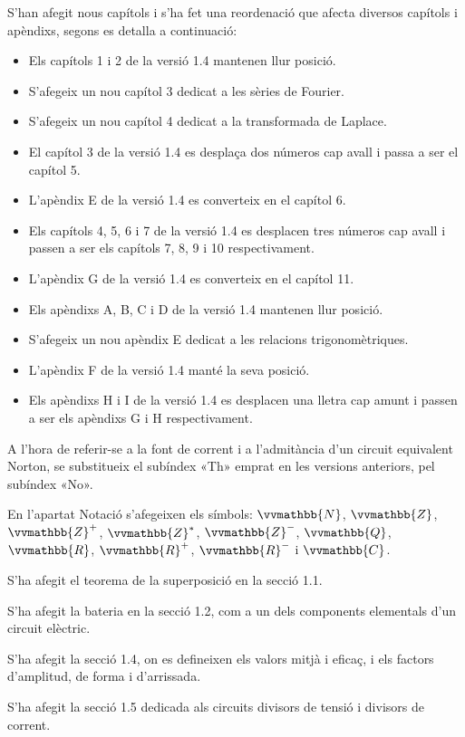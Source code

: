 S'han afegit nous capítols i s'ha fet una reordenació que afecta 
diversos capítols i apèndixs, segons es detalla a continuació:
\begin{itemize}
   \item Els capítols 1 i 2  de la versió 1.4 mantenen llur posició.
   \item S'afegeix un nou capítol 3 dedicat a les sèries de Fourier.
   \item S'afegeix un nou capítol 4 dedicat a la transformada de Laplace.
   \item El capítol 3 de la versió 1.4 es desplaça dos números cap
    avall i passa a ser el capítol 5.
   \item L'apèndix E de la versió 1.4 es converteix en el capítol 6.
   \item Els capítols 4, 5, 6 i 7  de la versió 1.4 es desplacen tres números cap
    avall i passen a ser els capítols 7, 8, 9 i 10 respectivament.
    \item L'apèndix G de la versió 1.4 es converteix en el capítol 11.
    \item Els apèndixs A, B, C i D de la versió 1.4 mantenen llur posició.
    \item S'afegeix un nou apèndix E dedicat a les relacions trigonomètriques.
    \item L'apèndix F de la versió 1.4 manté la seva posició.
    \item Els apèndixs H i I de la versió 1.4 es desplacen una lletra cap
    amunt i passen a ser els apèndixs G i H respectivament.
\end{itemize}


 A l'hora de referir-se a la font de corrent i a l'admitància d'un circuit equivalent
 Norton, se substitueix el subíndex «Th» emprat en les versions
anteriors, pel subíndex «No».

En l'apartat Notació s'afegeixen els símbols: $\vvmathbb{N}$,
$\vvmathbb{Z}$, $\vvmathbb{Z}^+$,  $\vvmathbb{Z}^*$, $\vvmathbb{Z}^-$,
$\vvmathbb{Q}$, $\vvmathbb{R}$, $\vvmathbb{R}^+$, $\vvmathbb{R}^-$ i
$\vvmathbb{C}$.

S'ha afegit el teorema de la superposició en la secció 1.1.


S'ha afegit la bateria en la secció 1.2, com a un
dels components elementals d'un circuit elèctric.

S'ha afegit la secció 1.4, on es defineixen els
valors mitjà i eficaç, i els factors d'amplitud, de forma i
d'arrissada.

S'ha afegit la secció 1.5 dedicada als
circuits divisors de tensió i divisors de corrent.

